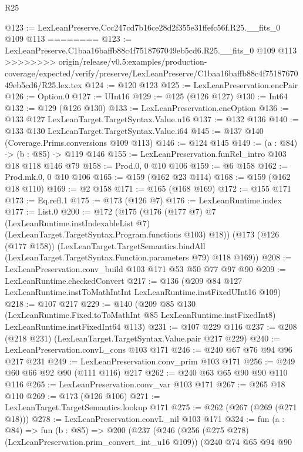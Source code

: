 \begin{lexlean}{R25}
\begin{coremodule}
{{{{{@123 := LexLeanPreserve.Ccc247cd7b16ce28d2f355e31ffefc56f.R25.__fits_0 @109 @113
========
@123 := LexLeanPreserve.C1baa16baffb88c4f7518767049eb5cd6.R25.__fits_0 @109 @113
>>>>>>>> origin/release/v0.5:examples/production-coverage/expected/verify/preserve/LexLeanPreserve/C1baa16baffb88c4f7518767049eb5cd6/R25.lex.tex
@124 := @120 @123
@125 := LexLeanPreservation.encPair
@126 := Option.{0}
@127 := UInt16
@129 := @125 (@126 @127)
@130 := Int64
@132 := @129 (@126 @130)
@133 := LexLeanPreservation.encOption
@136 := @133 @127 LexLeanTarget.TargetSyntax.Value.u16
@137 := @132 @136
@140 := @133 @130 LexLeanTarget.TargetSyntax.Value.i64
@145 := @137 @140 (Coverage.Prims.conversions @109 @113)
@146 := @124 @145
@149 := (a : @84) -> (b : @85) -> @119 @146
@155 := LexLeanPreservation.funRel_intro @103 @18 @118 @146 @79
@158 := Prod.{0, 0} @10 @106
@159 := @6 @158
@162 := Prod.mk.{0, 0} @10 @106
@165 := @159 (@162 @23 @114)
@168 := @159 (@162 @18 @110)
@169 := @2 @158
@171 := @165 (@168 @169)
@172 := @155 @171
@173 := Eq.refl.{1}
@175 := @173 (@126 @7)
@176 := LexLeanRuntime.index
@177 := List.{0}
@200 := @172
    (@175
      (@176
        (@177 @7)
        @7
        (LexLeanRuntime.instIndexableList @7)
        (LexLeanTarget.TargetSyntax.Program.functions @103)
        @18))
    (@173
      (@126 (@177 @158))
      (LexLeanTarget.TargetSemantics.bindAll
        (LexLeanTarget.TargetSyntax.Function.parameters @79)
        @118
        @169))
@208 := LexLeanPreservation.conv_build @103 @171 @53 @50 @77 @97 @90
@209 := LexLeanRuntime.checkedConvert
@217 := @136 (@209 @84 @127 LexLeanRuntime.instToMathIntInt LexLeanRuntime.instFixedUInt16 @109)
@218 := @107 @217
@229 := @140
    (@209
      @85
      @130
      (LexLeanRuntime.Fixed.toToMathInt @85 LexLeanRuntime.instFixedInt8)
      LexLeanRuntime.instFixedInt64
      @113)
@231 := @107 @229 @116
@237 := @208 (@218 @231) (LexLeanTarget.TargetSyntax.Value.pair @217 @229)
@240 := LexLeanPreservation.convL_cons @103 @171
@246 := @240 @67 @76 @94 @96 @217 @231
@249 := LexLeanPreservation.conv_prim @103 @171
@256 := @249 @60 @66 @92 @90 (@111 @116) @217
@262 := @240 @63 @65 @90 @90 @110 @116
@265 := LexLeanPreservation.conv_var @103 @171
@267 := @265 @18 @110
@269 := @173 (@126 @106)
@271 := LexLeanTarget.TargetSemantics.lookup @171
@275 := @262 (@267 (@269 (@271 @18)))
@278 := LexLeanPreservation.convL_nil @103 @171
@324 := fun (a : @84) =>
  fun (b : @85) =>
  @200
    (@237
      (@246
        (@256 (@275 @278) (LexLeanPreservation.prim_convert_int_u16 @109))
        (@240
          @74
          @65
          @94
          @90
}}}}}
\end{coremodule}
\end{lexlean}
